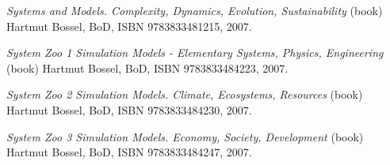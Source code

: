 \item
{\it Systems and Models. Complexity, Dynamics, Evolution, Sustainability} (book)\crlf
Hartmut Bossel, BoD, ISBN 9783833481215, 2007.

\item
{\it System Zoo 1 Simulation Models - Elementary Systems, Physics, Engineering} (book)\crlf
Hartmut Bossel, BoD, ISBN 9783833484223, 2007.

\item
{\it System Zoo 2 Simulation Models. Climate, Ecosystems, Resources} (book)\crlf
Hartmut Bossel, BoD, ISBN 9783833484230, 2007.

\item
{\it System Zoo 3 Simulation Models. Economy, Society, Development} (book)\crlf
Hartmut Bossel, BoD, ISBN 9783833484247, 2007.
\stopitemize

